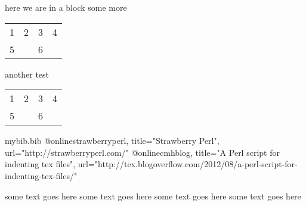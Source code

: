 


here we are in a block
some more
\begin{tabular}{cccc}
	1 & 2 & 3 & 4 \\
	5 &   & 6 &   \\
\end{tabular}

another test
\begin{tabular}{cccc}
	1 & 2 & 3 & 4 \\
	5 &   & 6 &   \\
\end{tabular}

\begin{filecontents}{mybib.bib}
	@online{strawberryperl,
		title="Strawberry Perl",
		url="http://strawberryperl.com/"}
	@online{cmhblog,
		title="A Perl script for indenting tex files",
		url="http://tex.blogoverflow.com/2012/08/a-perl-script-for-indenting-tex-files/"}
\end{filecontents}

\begin{myotherenvironment}
	some text goes here
	some text goes here
	some text goes here
	some text goes here
\end{myotherenvironment}

